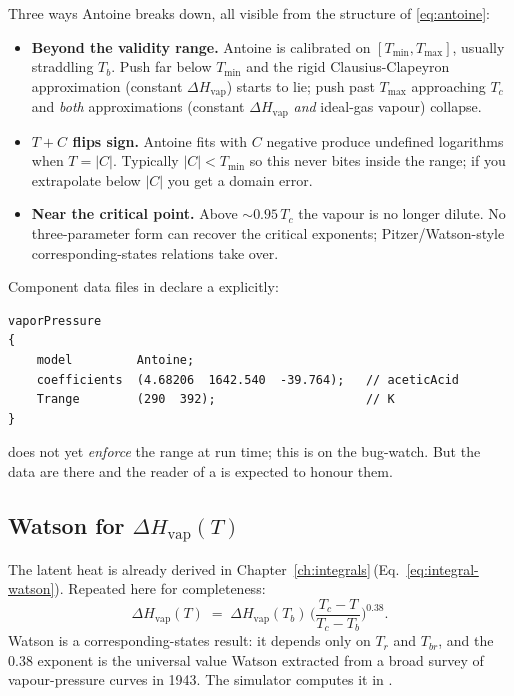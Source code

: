 \documentclass[11pt,a4paper]{article}
\newcommand{\Hvap}{\Delta H_{\!\mathrm{vap}}}
\begin{document}
Three ways Antoine breaks down, all visible from the structure
of \eqref{eq:antoine}:

\begin{itemize}[leftmargin=*,nosep]
  \item \textbf{Beyond the validity range.}  Antoine is calibrated
        on $[T_{\min}, T_{\max}]$, usually straddling $T_b$.  Push
        far below $T_{\min}$ and the rigid Clausius-Clapeyron
        approximation (constant $\Hvap$) starts to lie; push past
        $T_{\max}$ approaching $T_c$ and \emph{both} approximations
        (constant $\Hvap$ \emph{and} ideal-gas vapour) collapse.
  \item \textbf{$T + C$ flips sign.}  Antoine fits with $C$ negative
        produce undefined logarithms when $T = |C|$.  Typically
        $|C| < T_{\min}$ so this never bites inside the range; if
        you extrapolate below $|C|$ you get a domain error.
  \item \textbf{Near the critical point.}  Above $\sim 0.95\,T_c$
        the vapour is no longer dilute.  No three-parameter form
        can recover the critical exponents; Pitzer/Watson-style
        corresponding-states relations take over.
\end{itemize}

Component data files in  declare a
 explicitly:
\begin{lstlisting}
vaporPressure
{
    model         Antoine;
    coefficients  (4.68206  1642.540  -39.764);   // aceticAcid
    Trange        (290  392);                     // K
}
\end{lstlisting} does not yet \emph{enforce} the range at run time; this is on
the bug-watch.  But the data are there and the reader of a
 is expected to honour them.

\subsection{Watson for $\Hvap(T)$}

The latent heat is already derived in
Chapter~\ref{ch:integrals}\,(Eq.~\ref{eq:integral-watson}).
Repeated here for completeness:
\begin{equation}
   \Hvap(T) \;=\; \Hvap(T_b)\,
   \biggl(\frac{T_c - T}{T_c - T_b}\biggr)^{0.38}.
\end{equation}
Watson is a corresponding-states result: it depends only on $T_r$
and $T_{br}$, and the $0.38$ exponent is the universal value Watson
extracted from a broad survey of vapour-pressure curves in 1943.
The simulator computes it in .
\end{document}
